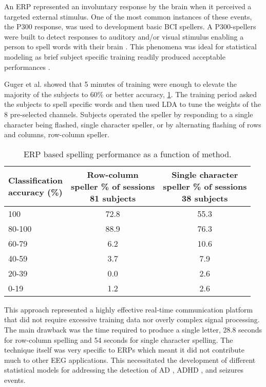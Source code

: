An \ac{ERP} represented an involuntary response by the brain when it perceived a targeted external stimulus. One of the most common instances of these events, the P300 response, was used to development basic \ac{BCI} spellers. A P300-spellers were built to detect responses to auditory and/or visual stimulus enabling a person to spell words with their brain \cite{Farwell1988}. This phenomena was ideal for statistical modeling as brief subject specific training readily produced acceptable performances \cite{Guger2009}.

Guger et al. \cite{Guger2009} showed that 5 minutes of training were enough to elevate the majority of the subjects to 60\% or better accuracy, \cref{tab:guger}. The training period asked the subjects to spell specific words and then used \ac{LDA} to tune the weights of the 8 pre-selected channels. Subjects operated the speller by responding to a single character being flashed, single character speller, or by alternating flashing of rows and columns, row-column speller.

\begin{table}[ht]
\centering
\caption[ERP Classification Performance]{ERP based spelling performance as a function of method.}
\begin{tabular}{l c c}
\toprule
\makecell{Classification\\accuracy (\%)} & \makecell{Row-column\\speller \% of sessions\\81 subjects} & \makecell{Single character\\speller \% of sessions\\38 subjects} \\
\midrule
100		&	72.8		&	55.3\\	
80-100	&	88.9		&	76.3\\
60-79	&	6.2		&	10.6\\
40-59	&	3.7		&	7.9\\
20-39	&	0.0		&	2.6\\
0-19		&	1.2		&	2.6\\
\bottomrule
\end{tabular}
\label{tab:guger}
\end{table}

This approach represented a highly effective real-time communication platform that did not require excessive training data nor overly complex signal processing. The main drawback was the time required to produce a single letter, 28.8 seconds for row-column spelling and 54 seconds for single character spelling. The technique itself was very specific to \acp{ERP} which meant it did not contribute much to other \ac{EEG} applications. This necessitated the development of different statistical models for addressing the detection of \ac{AD} \cite{Gross2014}, \ac{ADHD} \cite{Monastra2001}, and seizures \cite{Scheffer2009} events.

